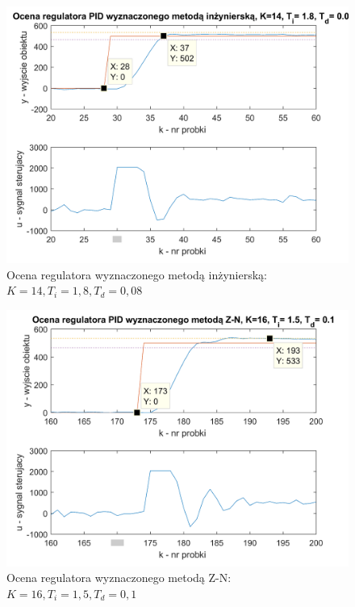 \documentclass[a4paper, 10pt]{article}
\begin{document}
\begin{figure}[H]
	\centering
	\includegraphics[width=0.9\linewidth]{ocenaPIDMI}
	\caption{Ocena regulatora wyznaczonego metodą inżynierską: $K=14, T_{i}=1,8, T_{d}=0,08$}
	\label{fig:ocenaPIDMI}
\end{figure}
\begin{figure}[H]
	\centering
	\includegraphics[width=0.9\linewidth]{ocenaPIDZN}
	\caption{Ocena regulatora wyznaczonego metodą Z-N: $K=16, T_{i}=1,5, T_{d}=0,1$}
	\label{fig:ocenaZN}
\end{figure}
\end{document}
